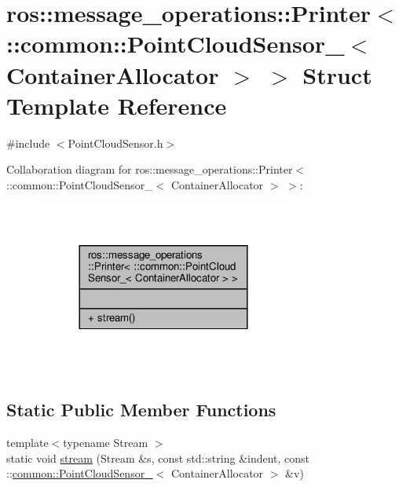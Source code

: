 \hypertarget{structros_1_1message__operations_1_1Printer_3_01_1_1common_1_1PointCloudSensor___3_01ContainerAllocator_01_4_01_4}{}\section{ros\+:\+:message\+\_\+operations\+:\+:Printer$<$ \+:\+:common\+:\+:Point\+Cloud\+Sensor\+\_\+$<$ Container\+Allocator $>$ $>$ Struct Template Reference}
\label{structros_1_1message__operations_1_1Printer_3_01_1_1common_1_1PointCloudSensor___3_01ContainerAllocator_01_4_01_4}


{\ttfamily \#include $<$Point\+Cloud\+Sensor.\+h$>$}



Collaboration diagram for ros\+:\+:message\+\_\+operations\+:\+:Printer$<$ \+:\+:common\+:\+:Point\+Cloud\+Sensor\+\_\+$<$ Container\+Allocator $>$ $>$\+:\nopagebreak
\begin{figure}[H]
\begin{center}
\leavevmode
\includegraphics[width=240pt]{df/d38/structros_1_1message__operations_1_1Printer_3_01_1_1common_1_1PointCloudSensor___3_01ContainerAllocator_01_4_01_4__coll__graph}
\end{center}
\end{figure}
\subsection*{Static Public Member Functions}
\begin{DoxyCompactItemize}
\item 
{\footnotesize template$<$typename Stream $>$ }\\static void \hyperlink{structros_1_1message__operations_1_1Printer_3_01_1_1common_1_1PointCloudSensor___3_01ContainerAllocator_01_4_01_4_acbf2ce09c10067d8017138fd175d8f53}{stream} (Stream \&s, const std\+::string \&indent, const \+::\hyperlink{structcommon_1_1PointCloudSensor__}{common\+::\+Point\+Cloud\+Sensor\+\_\+}$<$ Container\+Allocator $>$ \&v)
\end{DoxyCompactItemize}


